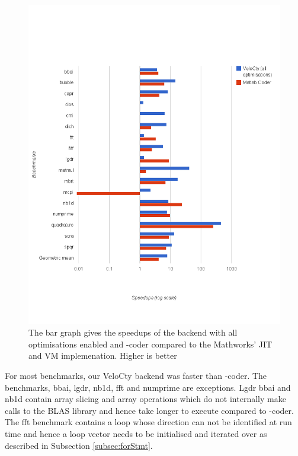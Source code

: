 \begin{figure}[htbp]
\centering
\includegraphics[scale=0.5]{Figures/results_cwochecks.png}
\caption[Experiment results for the baseline \velocty backend for \matlab benchmarks]{The bar graph gives the speedups of the \velocty backend with all optimisations enabled and \matlab-coder compared to the Mathworks' JIT and VM implemenation. Higher is better }
\label{fig:results_cwochecks}
\end{figure}

For most benchmarks, our VeloCty backend was faster than \matlab-coder. The benchmarks, \textsf{bbai}, \textsf{lgdr}, \textsf{nb1d}, \textsf{fft} and \textsf{numprime} are exceptions. \textsf{Lgdr} \textsf{bbai} and \textsf{nb1d} contain array slicing and array operations which do not internally make calls to the BLAS library and hence take longer to execute compared to \matlab-coder. The \textsf{fft} benchmark contains a loop whose direction can not be identified at run time and hence a loop vector needs to be initialised and iterated over as described in Subsection \ref{subsec:forStmt}. 


